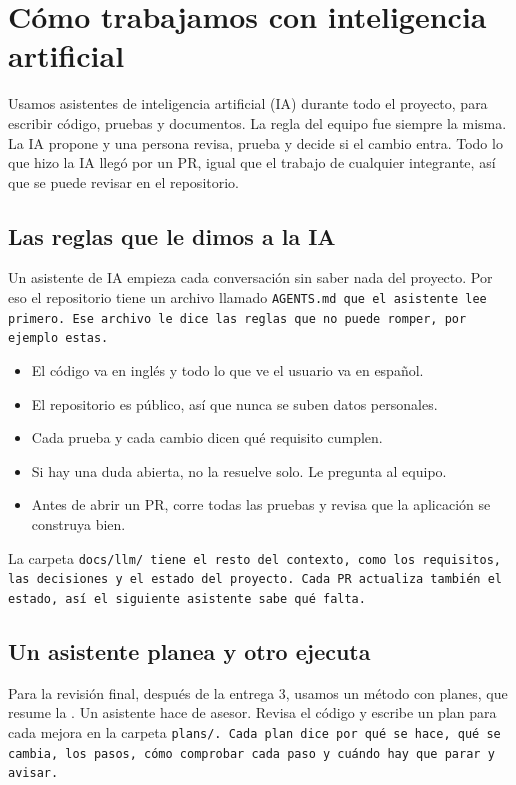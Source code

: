 \FloatBarrier
\section{Cómo trabajamos con inteligencia artificial}\label{sec:agentes}

Usamos asistentes de inteligencia artificial (IA) durante todo el proyecto, para escribir código, pruebas y documentos. La regla del equipo fue siempre la misma. La IA propone y una persona revisa, prueba y decide si el cambio entra. Todo lo que hizo la IA llegó por un PR, igual que el trabajo de cualquier integrante, así que se puede revisar en el repositorio.

\subsection{Las reglas que le dimos a la IA}\label{sec:agentsmd}

Un asistente de IA empieza cada conversación sin saber nada del proyecto. Por eso el repositorio tiene un archivo llamado \tt{AGENTS.md} que el asistente lee primero. Ese archivo le dice las reglas que no puede romper, por ejemplo estas.

\begin{itemize}
  \item El código va en inglés y todo lo que ve el usuario va en español.
  \item El repositorio es público, así que nunca se suben datos personales.
  \item Cada prueba y cada cambio dicen qué requisito cumplen.
  \item Si hay una duda abierta, no la resuelve solo. Le pregunta al equipo.
  \item Antes de abrir un PR, corre todas las pruebas y revisa que la aplicación se construya bien.
\end{itemize}

La carpeta \tt{docs/llm/} tiene el resto del contexto, como los requisitos, las decisiones y el estado del proyecto. Cada PR actualiza también el estado, así el siguiente asistente sabe qué falta.

\subsection{Un asistente planea y otro ejecuta}\label{sec:planes}

Para la revisión final, después de la entrega 3, usamos un método con planes, que resume la . Un asistente hace de asesor. Revisa el código y escribe un plan para cada mejora en la carpeta \tt{plans/}. Cada plan dice por qué se hace, qué se cambia, los pasos, cómo comprobar cada paso y cuándo hay que parar y avisar.

